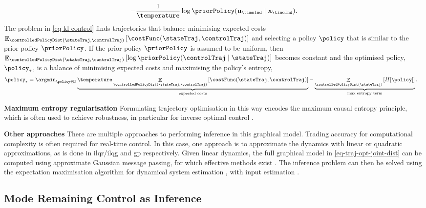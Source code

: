 \documentclass{mimosis-class/mimosis}
\numberwithin{equation}{chapter}
\DeclareMathOperator{\E}{\mathbb{E}}
\newcommand{\state}{\ensuremath{\mathbf{x}}}
\newcommand{\control}{\ensuremath{\mathbf{u}}}
\newcommand{\modeVar}{\ensuremath{\alpha}}
\begin{document}
{\begin{align}
- \frac{1}{\temperature} \log \priorPolicy(\control_\timeInd \mid \state_\timeInd).
\end{align}
The problem in \cref{eq-kl-control} finds trajectories that balance
minimising expected costs
\(\E_{\controlledPolicyDist(\stateTraj, \controlTraj)} \left[ \costFunc(\stateTraj, \controlTraj) \right]\)
and selecting a policy \(\policy\) that is similar to the prior policy \(\priorPolicy\).
If the prior policy \(\priorPolicy\) is assumed to be uniform, then
\(\E_{\controlledPolicyDist(\stateTraj, \controlTraj)} \left[ \log \priorPolicy(\controlTraj \mid \stateTraj) \right]\)
becomes constant and the optimised policy, \(\policy_*\), is a balance of minimising expected costs and
maximising the policy's entropy,
\begin{align} \label{eq-kl-control-uniform}
\policy_* &= \argmin_{\policy \in \mathbb{D}}
\underbrace{\temperature \E_{\controlledPolicyDist(\stateTraj, \controlTraj)}
\left[ \costFunc(\stateTraj, \controlTraj) \right]}_{\text{expected costs}}
- \underbrace{\E_{\controlledPolicyDist(\stateTraj)} \left[ H[\policy] \right]}_{\text{max entropy term}}.
\end{align}

\textbf{Maximum entropy regularisation} Formulating trajectory optimisation in this way encodes the
maximum causal entropy principle, which is often used to achieve robustness,
in particular for inverse optimal control \citep{ziebartModeling2010}.

\textbf{Other approaches} There are multiple approaches to performing inference in this graphical model.
Trading accuracy for computational complexity is often required for real-time control.
In this case, one approach is to approximate the dynamics with linear or
quadratic approximations, as is done in \acrshort{ilqr}/\acrshort{ilqg} and \acrshort{gp} respectively.
Given linear dynamics,
the full graphical model in \cref{eq-traj-opt-joint-dist} can be
computed using approximate Gaussian message passing, for which effective methods exist \citep{loeligerFactor2007}.
The inference problem can then be solved using the
expectation maximisation algorithm for dynamical system estimation
\citep{shumwayAPPROACH1982,ghahramaniLearning1999,schonSystem2011}, with input estimation \citep{watsonStochastic2021}.

\subsection{Mode Remaining Control as Inference \label{sec-traj-opt-inference}}
\label{sec:orgbbde43f}
\renewcommand{\modeVarTraj}{\ensuremath{\bar{\bm\modeVar}}}

}
\end{document}
